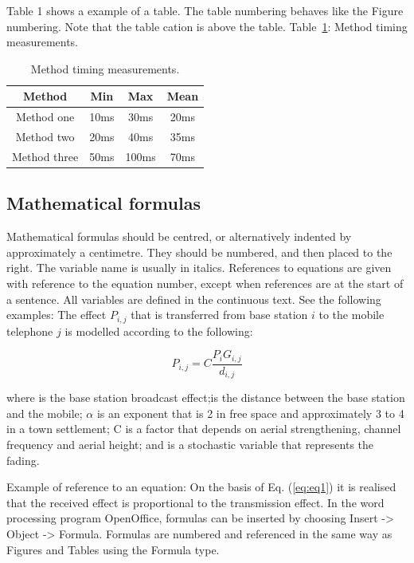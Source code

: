 Table 1 shows a example of a table. The table numbering behaves like the Figure
numbering. Note that the table cation is above the table. 
Table~\ref{table:methodmeasure}: Method timing measurements.

\begin{table}[ht!]
\centering
\caption{Method timing measurements.}\label{table:methodmeasure}
\begin{tabular}{c c c c}
 \midrule
  Method & Min & Max & Mean \\ [0.5ex]
 \midrule
  Method one & 10ms & 30ms & 20ms \\
 \midrule
  Method two & 20ms & 40ms & 35ms \\
 \midrule
  Method three & 50ms & 100ms & 70ms \\
 \midrule
\end{tabular}
\end{table}


\subsection{Mathematical formulas}\label{subsec:mathematicalformulas}
Mathematical formulas should be centred, or alternatively indented by
approximately a centimetre. They should be numbered, and then placed to the
right. The variable name is usually in italics. References to equations are
given with reference to the equation number, except when references are at the
start of a sentence. All variables are defined in the continuous text. See the
following examples:
The effect \(P_{i,j}\) that is transferred from base station \(i\) to the mobile
telephone \(j\) is modelled according to the following:

\begin{equation}
P_{i,j}=C \frac{P_i G_{i,j}} {d_{i,j}}
\label{eq:eq1}
\end{equation}

where is the base station broadcast effect;is the distance between the base
station and the mobile;  $\alpha$ is an exponent that is 2 in free space and
approximately 3 to 4 in a town settlement; C is a factor that depends on aerial
strengthening, channel frequency and aerial height; and is a stochastic variable
that represents the fading.

Example of reference to an equation: On the basis of Eq. (\ref{eq:eq1}) it is
realised that the received effect is proportional to the transmission effect. In
the word processing program OpenOffice, formulas can be inserted by choosing
Insert -> Object -> Formula. Formulas are numbered and referenced in the same
way as Figures and Tables using the Formula type.
